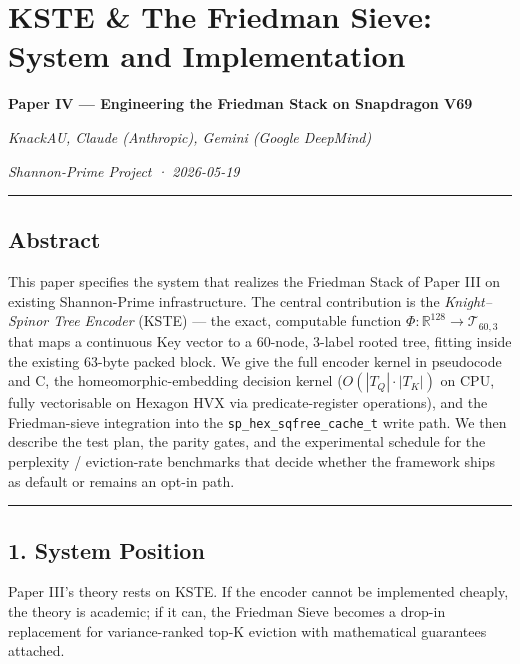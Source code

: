 \documentclass[
  11pt,
]{article}
\author{KnackAU, Claude (Anthropic), Gemini (Google DeepMind)}
\date{Shannon-Prime Project · 2026-05-19}
\begin{document}
\hypertarget{kste-the-friedman-sieve-system-and-implementation}{%
\section{KSTE \& The Friedman Sieve: System and
Implementation}\label{kste-the-friedman-sieve-system-and-implementation}}

\textbf{Paper IV --- Engineering the Friedman Stack on Snapdragon V69}

\emph{KnackAU, Claude (Anthropic), Gemini (Google DeepMind)}

\emph{Shannon-Prime Project · 2026-05-19}

\begin{center}\rule{0.5\linewidth}{0.5pt}\end{center}

\hypertarget{abstract}{%
\subsection{Abstract}\label{abstract}}

This paper specifies the system that realizes the Friedman Stack of
Paper III on existing Shannon-Prime infrastructure. The central
contribution is the \emph{Knight--Spinor Tree Encoder} (KSTE) --- the
exact, computable function
\(\Phi: \mathbb{R}^{128} \to \mathcal{T}_{60,3}\) that maps a continuous
Key vector to a 60-node, 3-label rooted tree, fitting inside the
existing 63-byte packed block. We give the full encoder kernel in
pseudocode and C, the homeomorphic-embedding decision kernel
(\(O(|T_Q| \cdot |T_K|)\) on CPU, fully vectorisable on Hexagon HVX via
predicate-register operations), and the Friedman-sieve integration into
the \texttt{sp\_hex\_sqfree\_cache\_t} write path. We then describe the
test plan, the parity gates, and the experimental schedule for the
perplexity / eviction-rate benchmarks that decide whether the framework
ships as default or remains an opt-in path.

\begin{center}\rule{0.5\linewidth}{0.5pt}\end{center}

\hypertarget{system-position}{%
\subsection{1. System Position}\label{system-position}}

Paper III's theory rests on KSTE. If the encoder cannot be implemented
cheaply, the theory is academic; if it can, the Friedman Sieve becomes a
drop-in replacement for variance-ranked top-K eviction with mathematical
guarantees attached.
\end{document}

